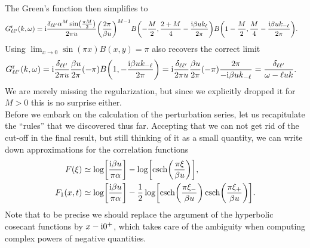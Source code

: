 \documentclass[english, parskip=full]{scrartcl}
\begin{document}
The Green's function then simplifies to
\begin{align}
G_{\ell\ell'}^\r(k,\omega) &= \i\frac{\delta_{\ell\ell'}\alpha^M \sin\kla*{\frac{\pi M}{2}} }{2\pi u} \kla*{\frac{2\pi}{\beta u}}^{M-1} B\kla*{-\frac{M}{2}, \frac{2+M}{4} - \frac{\i\beta uk_\ell}{2\pi}} B\kla*{1 - \frac{M}{2}, \frac{M}{4} - \frac{\i\beta uk_{-\ell}}{2\pi}}.
\end{align}
Using $\lim_{x\rightarrow 0} \sin(\pi x) B(x,y) = \pi$ also recovers the correct limit
\begin{align}
G_{\ell\ell'}^\r(k,\omega) &= \i\frac{\delta_{\ell\ell'}}{2\pi u} \frac{\beta u}{2\pi} (-\pi) B\kla*{1, -\frac{\i\beta uk_{-\ell}}{2\pi}} = \i\frac{\delta_{\ell\ell'}}{2\pi u} \frac{\beta u}{2\pi} (-\pi) \frac{2\pi}{-\i\beta uk_{-\ell}} = \frac{\delta_{\ell\ell'}}{\omega - \ell uk}.
\end{align}
We are merely missing the regularization, but since we explicitly dropped it for $M>0$ this is no surprise either.\\
Before we embark on the calculation of the perturbation series, let us recapitulate the ``rules'' that we discovered thus far.
Accepting that we can not get rid of the cut-off in the final result, but still thinking of it as a small quantity, we can write down approximations for the correlation functions
\begin{align}
F(\xi) &\simeq \log\klb*{\frac{\i\beta u}{\pi\alpha}} - \log\klb*{\csch\kla*{\frac{\pi \xi}{\beta u}}},\\
F_1(x,t) &\simeq \log\klb*{
\frac{\i\beta u}{\pi\alpha}} - \frac{1}{2}\log\klb*{ \csch\kla*{\frac{\pi \xi_-}{\beta u}} \csch\kla*{\frac{\pi \xi_+}{\beta u}}}.
\end{align}
Note that to be precise we should replace the argument of the hyperbolic cosecant functions by $x-\text{i} 0^+$, which takes care of the ambiguity when computing complex powers of negative quantities.
\end{document}
